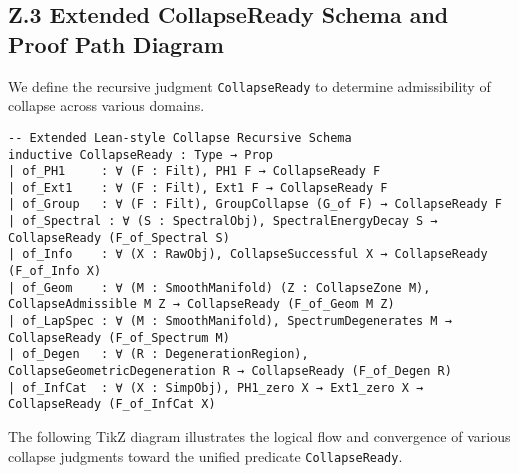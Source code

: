 \documentclass[11pt]{article}
\begin{document}
\subsection*{Z.3 Extended CollapseReady Schema and Proof Path Diagram}

We define the recursive judgment \texttt{CollapseReady} to determine admissibility of collapse across various domains.

\begin{lstlisting}[mathescape=false]
-- Extended Lean-style Collapse Recursive Schema
inductive CollapseReady : Type → Prop
| of_PH1     : ∀ (F : Filt), PH1 F → CollapseReady F
| of_Ext1    : ∀ (F : Filt), Ext1 F → CollapseReady F
| of_Group   : ∀ (F : Filt), GroupCollapse (G_of F) → CollapseReady F
| of_Spectral : ∀ (S : SpectralObj), SpectralEnergyDecay S → CollapseReady (F_of_Spectral S)
| of_Info    : ∀ (X : RawObj), CollapseSuccessful X → CollapseReady (F_of_Info X)
| of_Geom    : ∀ (M : SmoothManifold) (Z : CollapseZone M), CollapseAdmissible M Z → CollapseReady (F_of_Geom M Z)
| of_LapSpec : ∀ (M : SmoothManifold), SpectrumDegenerates M → CollapseReady (F_of_Spectrum M)
| of_Degen   : ∀ (R : DegenerationRegion), CollapseGeometricDegeneration R → CollapseReady (F_of_Degen R)
| of_InfCat  : ∀ (X : SimpObj), PH1_zero X → Ext1_zero X → CollapseReady (F_of_InfCat X)
\end{lstlisting}

\vspace{1em}
\noindent The following TikZ diagram illustrates the logical flow and convergence of various collapse judgments toward the unified predicate \texttt{CollapseReady}.
\end{document}
